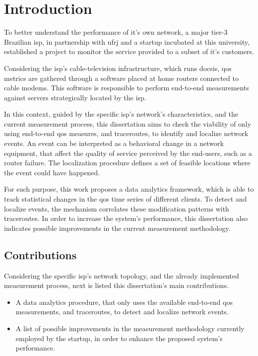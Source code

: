 \chapter{Introduction}

To better understand the performance of it's own network, a major
tier-3 Brazilian \gls*{isp}, in partnership with \gls*{ufrj} and a startup
incubated at this university,
established a project to monitor the service provided to a subset
of it's customers.

Considering the \gls*{isp}'s cable-television infrastructure,
which runs \gls*{docsis},
\gls*{qos} metrics are gathered through a software placed at home routers
connected to cable modems. This software is responsible to perform end-to-end
measurements against servers strategically located by the \gls*{isp}.

In this context, guided by the specific \gls*{isp}'s network's characteristics,
and the current measurement process,
this dissertation aims to check the viability of
only using end-to-end \gls*{qos} measures, and traceroutes,
to identify and localize network events. An event can be interpreted as a
behavioral change in a network equipment, that affect the quality of service
perceived by the end-users,
such as a router failure. The localization procedure defines a set of
feasible locations where the event could have happened.

For such purpose, this work proposes a data analytics framework, which is able
to track statistical changes in the \gls*{qos} time series of different
clients.
To detect and localize events, the mechanism correlates these modification
patterns with traceroutes.
In order to increase the system's performance,
this dissertation also indicates possible improvements in the current
measurement methodology.

\section{Contributions}

Considering the specific \gls*{isp}'s network topology,
and the already implemented
measurement process, next is listed this dissertation's main contributions.

\begin{itemize}
\item
A data analytics procedure, that only uses the available end-to-end \gls*{qos}
measurements, and traceroutes, to detect and localize network events.

\item
A list of possible improvements in the measurement methodology currently
employed by the startup, in order to enhance the proposed system's performance.

\end{itemize}

